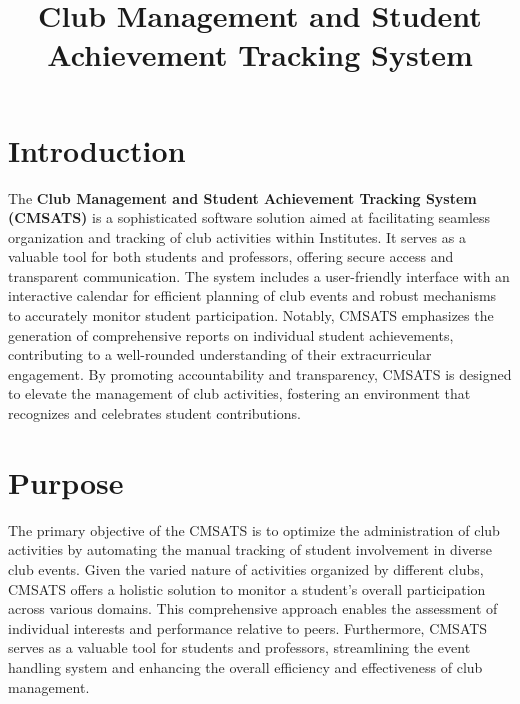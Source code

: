 \renewcommand{\normalsize}{\large} %

\title{\textbf{Club Management and Student Achievement Tracking System}}
\date{}

\vspace{0.5em} %

\section{Introduction}
The \textbf{Club Management and Student Achievement Tracking System (CMSATS)} is a sophisticated software solution aimed at facilitating seamless organization and tracking of club activities within Institutes. It serves as a valuable tool for both students and professors, offering secure access and transparent communication. The system includes a user-friendly interface with an interactive calendar for efficient planning of club events and robust mechanisms to accurately monitor student participation. Notably, CMSATS emphasizes the generation of comprehensive reports on individual student achievements, contributing to a well-rounded understanding of their extracurricular engagement. By promoting accountability and transparency, CMSATS is designed to elevate the management of club activities, fostering an environment that recognizes and celebrates student contributions.

\section{Purpose}

The primary objective of the CMSATS is to optimize the administration of club activities by automating the manual tracking of student involvement in diverse club events. Given the varied nature of activities organized by different clubs, CMSATS offers a holistic solution to monitor a student's overall participation across various domains. This comprehensive approach enables the assessment of individual interests and performance relative to peers. Furthermore, CMSATS serves as a valuable tool for students and professors, streamlining the event handling system and enhancing the overall efficiency and effectiveness of club management.

